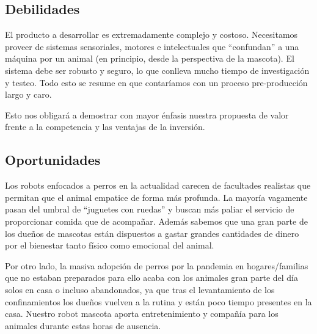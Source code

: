 \subsection{Debilidades}

El producto a desarrollar es extremadamente complejo y costoso. Necesitamos proveer de sistemas sensoriales, motores e intelectuales que ``confundan'' a una máquina por un animal (en principio, desde la perspectiva de la mascota). El sistema debe ser robusto y seguro, lo que conlleva mucho tiempo de investigación y testeo.
Todo esto se resume en que contaríamos con un proceso pre-producción largo y caro.

\vspace{\baselineskip}

Esto nos obligará a demostrar con mayor énfasis nuestra propuesta de valor frente a la competencia y las ventajas de la inversión.

\subsection{Oportunidades}

Los robots enfocados a perros en la actualidad carecen de facultades realistas que permitan que el animal empatice de forma más profunda. La mayoría vagamente pasan del umbral de ``juguetes con ruedas'' y buscan más paliar el servicio de proporcionar comida que de acompañar. Además sabemos que una gran parte de los dueños de mascotas están dispuestos a gastar grandes cantidades de dinero por el bienestar tanto físico como emocional del animal.

\vspace{\baselineskip}

Por otro lado, la masiva adopción de perros por la pandemia en hogares/familias que no estaban preparados para ello acaba con los animales gran parte del día solos en casa o incluso abandonados, ya que tras el levantamiento de los confinamientos los dueños vuelven a la rutina y están poco tiempo presentes en la casa. Nuestro robot mascota aporta entretenimiento y compañía para los animales durante estas horas de ausencia.

